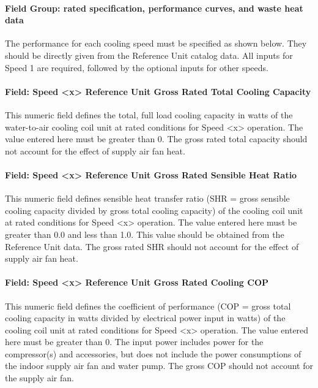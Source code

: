 \paragraph{Field Group: rated specification, performance curves, and waste heat data}\label{field-group-rated-specification-performance-curves-and-waste-heat-data-1}

The performance for each cooling speed must be specified as shown below. They should be directly given from the Reference Unit catalog data. All inputs for Speed 1 are required, followed by the optional inputs for other speeds.

\paragraph{Field: Speed \textless{}x\textgreater{} Reference Unit Gross Rated Total Cooling Capacity}\label{field-speed-x-reference-unit-gross-rated-total-cooling-capacity-1}

This numeric field defines the total, full load cooling capacity in watts of the water-to-air cooling coil unit at rated conditions for Speed \textless{}x\textgreater{} operation. The value entered here must be greater than 0. The gross rated total capacity should not account for the effect of supply air fan heat.

\paragraph{Field: Speed \textless{}x\textgreater{} Reference Unit Gross Rated Sensible Heat Ratio}\label{field-speed-x-reference-unit-gross-rated-sensible-heat-ratio-1}

This numeric field defines sensible heat transfer ratio (SHR = gross sensible cooling capacity divided by gross total cooling capacity) of the cooling coil unit at rated conditions for Speed \textless{}x\textgreater{} operation. The value entered here must be greater than 0.0 and less than 1.0. This value should be obtained from the Reference Unit data. The gross rated SHR should not account for the effect of supply air fan heat.

\paragraph{Field: Speed \textless{}x\textgreater{} Reference Unit Gross Rated Cooling COP}\label{field-speed-x-reference-unit-gross-rated-cooling-cop-1}

This numeric field defines the coefficient of performance (COP = gross total cooling capacity in watts divided by electrical power input in watts) of the cooling coil unit at rated conditions for Speed \textless{}x\textgreater{} operation. The value entered here must be greater than 0. The input power includes power for the compressor(s) and accessories, but does not include the power consumptions of the indoor supply air fan and water pump. The gross COP should not account for the supply air fan.

